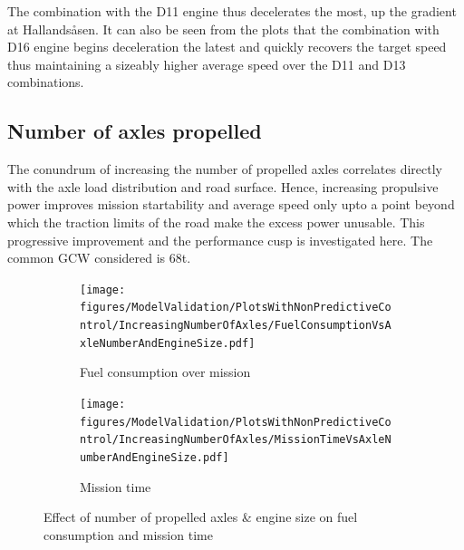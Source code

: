 \documentclass[ExampleMasters.tex]{subfiles}
\begin{document}
	The combination with the D11 engine thus decelerates the most, up the gradient at Hallands\aa sen. It can also be seen from the plots that the combination with D16 engine begins deceleration the latest and quickly recovers the target speed thus maintaining a sizeably higher average speed over the D11 and D13 combinations.
	\subsection{Number of axles propelled}
	The conundrum of increasing the number of propelled axles correlates directly with the axle load distribution and road surface. Hence, increasing propulsive power improves mission startability and average speed only upto a point beyond which the traction limits of the road make the excess power unusable. This progressive improvement and the performance cusp is investigated here. The common GCW considered is 68t.

	\begin{figure}
		\begin{subfigure}{.5\textwidth}
			\centering
			\texttt{[image: figures/ModelValidation/PlotsWithNonPredictiveControl/IncreasingNumberOfAxles/FuelConsumptionVsAxleNumberAndEngineSize.pdf]}
			\caption{Fuel consumption over mission}
		\end{subfigure}
		\begin{subfigure}{.5\textwidth}
			\centering
			\texttt{[image: figures/ModelValidation/PlotsWithNonPredictiveControl/IncreasingNumberOfAxles/MissionTimeVsAxleNumberAndEngineSize.pdf]}
			\caption{Mission time}
		\end{subfigure}
		\caption{Effect of number of propelled axles \& engine size on fuel consumption and mission time}
		\label{timeFuelNumberOfAxlesEngine}
	\end{figure}
\end{document}
